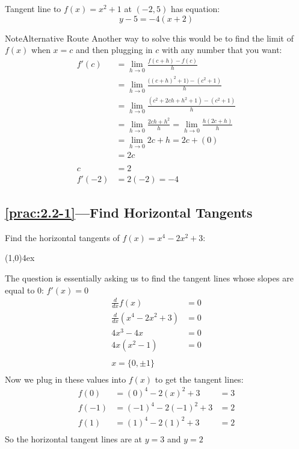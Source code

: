 \documentclass{MathNotes}
\newenvironment{note}[1]{\begin{YellowBox}{Note}{#1}}{\end{YellowBox}}
\newcommand{\br}{
	\begin{center}
		\line(1,0){4ex}
	\end{center}}
\begin{document}
Tangent line to $f(x)=x^2+1$ at $(-2, 5)$ has equation: $$y-5=-4(x+2)$$
\begin{note}{Alternative Route}
	Another way to solve this would be to find the limit of $f(x)$ when $x=c$
	and then plugging in $c$ with any number that you want:
	\begin{align*}
		f'(c)  & =\lim_{h\to 0}\frac{f(c+h)-f(c)}{h}                              \\
		       & =\lim_{h\to 0}\frac{\bigl((c+h)^2+1\bigr)-(c^2+1)}{h}            \\
		       & =\lim_{h\to 0}\frac{(c^2+2ch+h^2+1)-(c^2+1)}{h}                  \\
		       & =\lim_{h\to 0}\frac{2ch+h^2}{h} = \lim_{h\to 0}\frac{h(2c+h)}{h} \\
		       & =\lim_{h\to 0} 2c+h=2c+(0)                                       \\
		       & =2c                                                              \\
		\\
		c      & =2                                                               \\
		f'(-2) & =2(-2)=-4
	\end{align*}
\end{note}

\newpage
\subsection*{\ref{prac:2.2-1}---Find Horizontal Tangents}\label{ans:2.2-1}
Find the horizontal tangents of $f(x)=x^4-2x^2+3$:
\br
The question is essentially asking us to find the tangent lines whose
slopes are equal to 0: $f'(x)=0$
\begin{align*}
	\frac{d}{dx}f(x)         & =0 \\
	\frac{d}{dx}(x^4-2x^2+3) & =0 \\
	4x^3-4x                  & =0 \\
	4x(x^2-1)                & =0 \\
	\\
	x=\{0, \pm 1\}                \\
\end{align*}
Now we plug in these values into $f(x)$ to get the tangent lines:
\begin{align*}
	f(0)  & =(0)^4-2(x)^2+3   & =3 \\
	f(-1) & =(-1)^4-2(-1)^2+3 & =2 \\
	f(1)  & =(1)^4-2(1)^2+3   & =2 \\
\end{align*}
So the horizontal tangent lines are at $y=3$ and $y=2$
\end{document}
